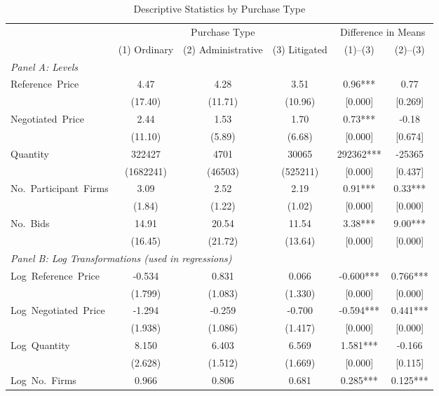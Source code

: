 \begin{table}[ht]
  \centering
  \caption{Descriptive Statistics by Purchase Type}
  \label{tab:desc_stats}
  \small
  \begin{threeparttable}
  \begin{tabular}{lccccc}
    \hline\hline
    & \multicolumn{3}{c}{Purchase Type} & \multicolumn{2}{c}{Difference in Means} \\
    \cmidrule(lr){2-4} \cmidrule(lr){5-6}
    & (1) Ordinary & (2) Administrative & (3) Litigated & (1)--(3) & (2)--(3) \\
    \hline
    \multicolumn{6}{l}{\textit{Panel A: Levels}} \\[3pt]
    Reference~Price & 4.47 & 4.28 & 3.51 & 0.96*** & 0.77 \\
    & (17.40) & (11.71) & (10.96) & [0.000] & [0.269] \\[3pt]
    Negotiated~Price & 2.44 & 1.53 & 1.70 & 0.73*** & -0.18 \\
    & (11.10) & (5.89) & (6.68) & [0.000] & [0.674] \\[3pt]
    Quantity & 322427 & 4701 & 30065 & 292362*** & -25365 \\
    & (1682241) & (46503) & (525211) & [0.000] & [0.437] \\[3pt]
    No.~Participant~Firms & 3.09 & 2.52 & 2.19 & 0.91*** & 0.33*** \\
    & (1.84) & (1.22) & (1.02) & [0.000] & [0.000] \\[3pt]
    No.~Bids & 14.91 & 20.54 & 11.54 & 3.38*** & 9.00*** \\
    & (16.45) & (21.72) & (13.64) & [0.000] & [0.000] \\[3pt]
    \hline
    \multicolumn{6}{l}{\textit{Panel B: Log Transformations (used in regressions)}} \\[3pt]
    Log~Reference~Price & -0.534 & 0.831 & 0.066 & -0.600*** & 0.766*** \\
    & (1.799) & (1.083) & (1.330) & [0.000] & [0.000] \\[3pt]
    Log~Negotiated~Price & -1.294 & -0.259 & -0.700 & -0.594*** & 0.441*** \\
    & (1.938) & (1.086) & (1.417) & [0.000] & [0.000] \\[3pt]
    Log~Quantity & 8.150 & 6.403 & 6.569 & 1.581*** & -0.166 \\
    & (2.628) & (1.512) & (1.669) & [0.000] & [0.115] \\[3pt]
    Log~No.~Firms & 0.966 & 0.806 & 0.681 & 0.285*** & 0.125*** \\

\end{tabular}
\end{threeparttable}
\end{table}
